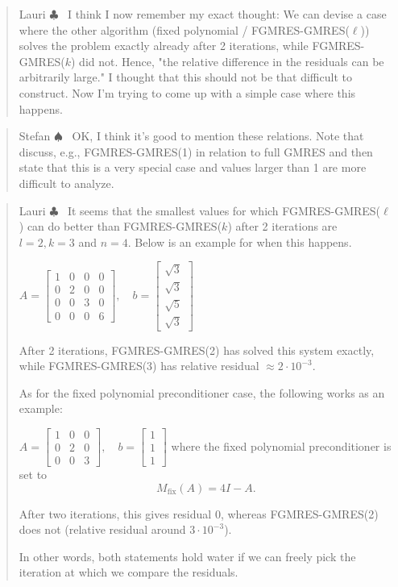 \documentclass{siamart251216}
\newenvironment{lauri}{\begin{quote}\color{brilliantrose} \small\sf Lauri $\clubsuit$~}{\end{quote}}
\newenvironment{stefan}{\begin{quote}\color{amethyst} \small\sf Stefan $\spadesuit$~}{\end{quote}}
\begin{document}
\iffalse
\begin{lauri}
    I think I now remember my exact thought: We can devise a case where the other algorithm (fixed polynomial / FGMRES-GMRES($\ell$)) solves the problem exactly already after 2 iterations, while FGMRES-GMRES($k$) did not. Hence, "the relative difference in the residuals can be arbitrarily large." I thought that this should not be that difficult to construct. Now I'm trying to come up with a simple case where this happens.
\end{lauri}
\begin{stefan}
    OK, I think it's good to mention these relations. Note that \cite{simoncini2002flexible}  discuss, e.g., FGMRES-GMRES(1) in relation to full GMRES and then state that this is a very special case and values larger than 1 are more difficult to analyze.
\end{stefan}
\begin{lauri}
    It seems that the smallest values for which FGMRES-GMRES($\ell$) can do better than  FGMRES-GMRES($k$) after 2 iterations are $l=2,k=3$ and $n=4$. Below is an example for when this happens.

    $A = \begin{bmatrix}
            1 & 0 & 0 & 0 \\
            0 & 2 & 0 & 0 \\
            0 & 0 & 3 & 0 \\
            0 & 0 & 0 & 6
        \end{bmatrix}, \quad b = \begin{bmatrix} \sqrt{3} \\ \sqrt{3} \\ \sqrt{5} \\ \sqrt{3} \end{bmatrix}$

    After 2 iterations,  FGMRES-GMRES(2) has solved this system exactly, while  FGMRES-GMRES(3) has relative residual $\approx 2 \cdot 10^{-3}$.

    As for the fixed polynomial preconditioner case, the following works as an example:

    $A = \begin{bmatrix}
            1 & 0 & 0 \\
            0 & 2 & 0 \\
            0 & 0 & 3
        \end{bmatrix}, \quad b = \begin{bmatrix} 1 \\ 1 \\ 1 \end{bmatrix}$
    where the fixed polynomial preconditioner is set to
    $$ M_{\text{fix}}(A) = 4 I - A. $$

    After two iterations, this gives residual 0, whereas FGMRES-GMRES(2) does not (relative residual around $3 \cdot 10^{-3}$).

    In other words, both statements hold water if we can freely pick the iteration at which we compare the residuals.
\end{lauri}
\end{document}
